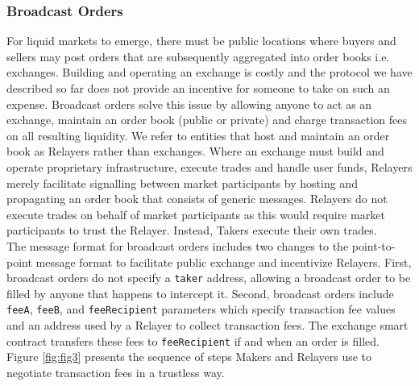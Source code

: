 \documentclass[10pt]{article}
\begin{document}
\pagebreak

\subsubsection{Broadcast Orders}

\noindent For liquid markets to emerge, there must be public locations where buyers and sellers may post orders that are subsequently aggregated into order books i.e. exchanges. Building and operating an exchange is costly and the protocol we have described so far does not provide an incentive for someone to take on such an expense. Broadcast orders solve this issue by allowing anyone to act as an exchange, maintain an order book (public or private) and charge transaction fees on all resulting liquidity. We refer to entities that host and maintain an order book as Relayers rather than exchanges. Where an exchange must build and operate proprietary infrastructure, execute trades and handle user funds, Relayers merely facilitate signalling between market participants by hosting and propagating an order book that consists of generic messages. Relayers do not execute trades on behalf of market participants as this would require market participants to trust the Relayer. Instead, Takers execute their own trades. \\

\noindent The message format for broadcast orders includes two changes to the point-to-point message format to facilitate public exchange and incentivize Relayers. First, broadcast orders do not specify a \texttt{taker} address, allowing a broadcast order to be filled by anyone that happens to intercept it. Second, broadcast orders include \texttt{feeA}, \texttt{feeB}, and \texttt{feeRecipient} parameters which specify transaction fee values and an address used by a Relayer to collect transaction fees. The exchange smart contract transfers these fees to \texttt{feeRecipient} if and when an order is filled. Figure \ref{fig:fig3} presents the sequence of steps Makers and Relayers use to negotiate transaction fees in a trustless way.
\end{document}
